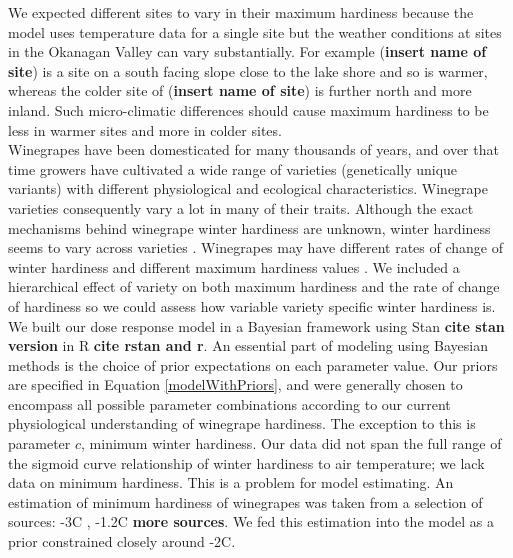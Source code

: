 \documentclass[11pt,letter]{article}
\begin{document}
We expected different sites to vary in their maximum hardiness because the model uses temperature data for a single site but the weather conditions at sites in the Okanagan Valley can vary substantially. For example (\textbf{insert name of site}) is a site on a south facing slope close to the lake shore and so is warmer, whereas the colder site of (\textbf{insert name of site}) is further north and more inland. Such micro-climatic differences should cause maximum hardiness to be less in warmer sites and more in colder sites. \\

Winegrapes have been domesticated for many thousands of years, and over that time growers have cultivated a wide range of varieties (genetically unique variants) with different physiological and ecological characteristics. Winegrape varieties consequently vary a lot in many of their traits. Although the exact mechanisms behind winegrape winter hardiness are unknown, winter hardiness seems to vary across varieties \cite{Mills2006,Ferguson2014,Kovaleski2018a}. Winegrapes may have different rates of change of winter hardiness\cite{Kovaleski2018a,Ferguson2014} and different maximum hardiness values \cite{Ferguson2014}. We included a hierarchical effect of variety on both maximum hardiness and the rate of change of hardiness so we could assess how variable variety specific winter hardiness is. \\

We built our dose response model in a Bayesian framework using Stan \textbf{cite stan version} in R \textbf{cite rstan and r}. An essential part of modeling using Bayesian methods is the choice of prior expectations on each parameter value. Our priors are specified in Equation \ref{modelWithPriors}, and were generally chosen to encompass all possible parameter combinations according to our current physiological understanding of winegrape hardiness. The exception to this is parameter $c$, minimum winter hardiness. Our data did not span the full range of the sigmoid curve relationship of winter hardiness to air temperature; we lack data on minimum hardiness. This is a problem for model estimating. An estimation of minimum hardiness of winegrapes was taken from a selection of sources: -3\textdegree C \cite{Ferguson2011}, -1.2\textdegree C \cite{Ferguson2014} \textbf{more sources}. We fed this estimation into the model as a prior constrained closely around -2\textdegree C.  
\end{document}
